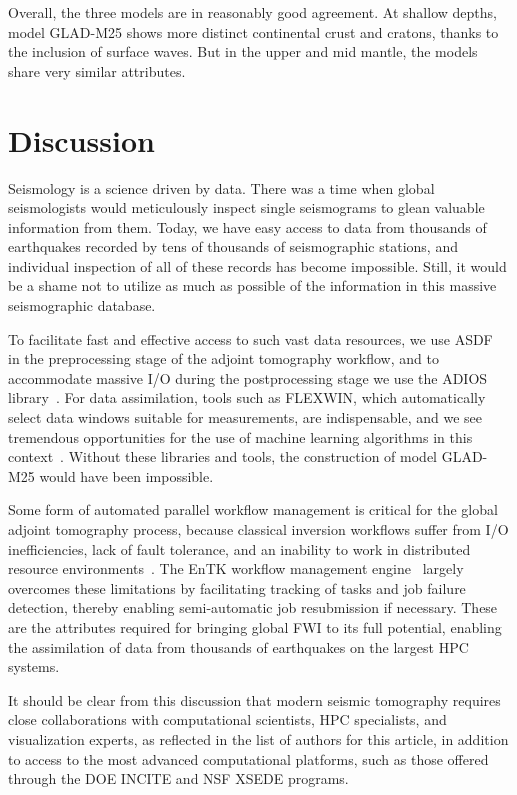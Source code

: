 Overall, the three models are in reasonably good agreement.
At shallow depths, model GLAD-M25 shows more distinct continental crust and cratons, thanks to the inclusion of surface waves.
But in the upper and mid mantle,
the models share very similar attributes.

\section{Discussion}

Seismology is a science driven by data.
There was a time when global seismologists would meticulously inspect single seismograms to glean valuable information from them.
Today, we have easy access to data from thousands of earthquakes recorded by tens of thousands of seismographic stations, and individual inspection of all of these records has become impossible.
Still, it would be a shame not to utilize as much as possible of the information in this massive seismographic database.

To facilitate fast and effective access to such vast data resources,
we use ASDF~\cite{krischer2016adaptable} in the preprocessing stage of the adjoint tomography workflow,
and to accommodate massive I/O during the postprocessing stage we use the ADIOS library~\cite{liu2014hello}.
For data assimilation,
tools such as FLEXWIN, which automatically select data windows suitable for measurements, are indispensable, and we see tremendous opportunities for the use of machine learning algorithms in this context~\cite{chen2017}.
Without these libraries and tools, the construction of model GLAD-M25 would have been impossible. 

Some form of automated parallel workflow management is critical for the global adjoint tomography process,
because classical inversion workflows suffer from I/O inefficiencies, lack of fault tolerance, and an inability to work in distributed resource environments~\cite{Lefebvre2018}.
The EnTK workflow management engine~\cite{EnTK2017}
largely overcomes these limitations by facilitating tracking of tasks and job failure detection,
thereby enabling semi-automatic job resubmission if necessary.
These are the attributes required for bringing global FWI to its full potential,
enabling the assimilation of data from thousands of earthquakes on the largest HPC systems.

It should be clear from this discussion that modern seismic tomography requires close collaborations with computational scientists, HPC specialists, and visualization experts,
as reflected in the list of authors for this article, in addition to access to the most advanced computational platforms,
such as those offered through the DOE INCITE and NSF XSEDE programs.

